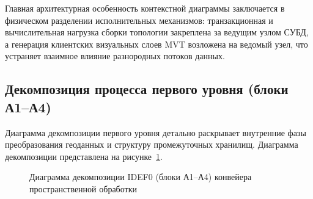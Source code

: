 Главная архитектурная особенность контекстной диаграммы заключается в физическом разделении исполнительных механизмов: транзакционная и вычислительная нагрузка сборки топологии закреплена за ведущим узлом СУБД, а генерация клиентских визуальных слоев MVT возложена на ведомый узел, что устраняет взаимное влияние разнородных потоков данных.

\subsection{Декомпозиция процесса первого уровня (блоки А1--А4)}

Диаграмма декомпозиции первого уровня детально раскрывает внутренние фазы преобразования геоданных и структуру промежуточных хранилищ. Диаграмма декомпозиции представлена на рисунке~\ref{fig:idef0_decomp}.

\begin{figure}[htbp]
    \centering
    
    \caption{Диаграмма декомпозиции IDEF0 (блоки А1--А4) конвейера пространственной обработки}
    \label{fig:idef0_decomp}
\end{figure}

